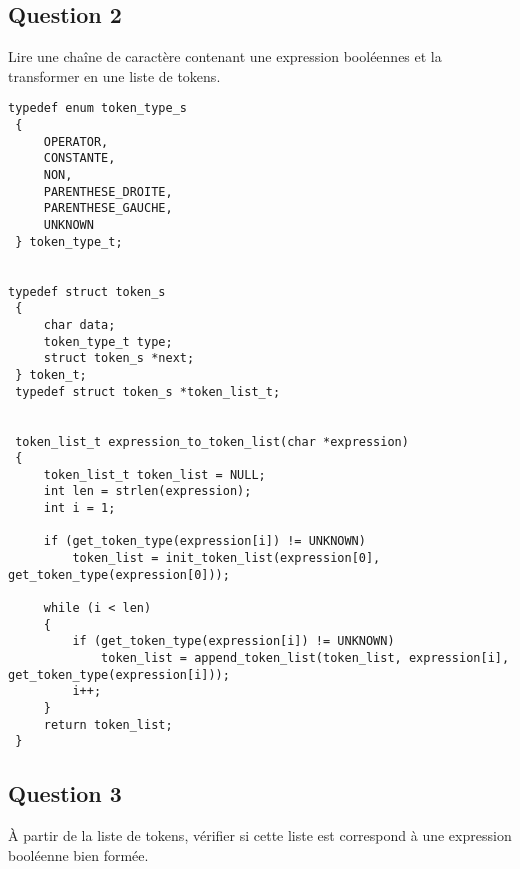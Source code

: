 \documentclass[12pt,a4paper]{article}
\begin{document}
\newpage
\subsection{Question 2}
Lire une chaîne de caractère contenant une expression booléennes et la transformer en une
liste de tokens.
\begin{lstlisting}[style=CStyle]
typedef enum token_type_s
 {
     OPERATOR,
     CONSTANTE,
     NON,
     PARENTHESE_DROITE,
     PARENTHESE_GAUCHE,
     UNKNOWN
 } token_type_t;
 

typedef struct token_s
 {
     char data;
     token_type_t type;
     struct token_s *next;
 } token_t;
 typedef struct token_s *token_list_t;


 token_list_t expression_to_token_list(char *expression)
 {
     token_list_t token_list = NULL;
     int len = strlen(expression);
     int i = 1;
 
     if (get_token_type(expression[i]) != UNKNOWN)
         token_list = init_token_list(expression[0], get_token_type(expression[0]));

     while (i < len)
     {
         if (get_token_type(expression[i]) != UNKNOWN)
             token_list = append_token_list(token_list, expression[i], get_token_type(expression[i]));
         i++;
     }
     return token_list;
 }
\end{lstlisting}

\newpage

\subsection{Question 3}

À partir de la liste de tokens, vérifier si cette liste est correspond à une expression booléenne
bien formée.
\end{document}
